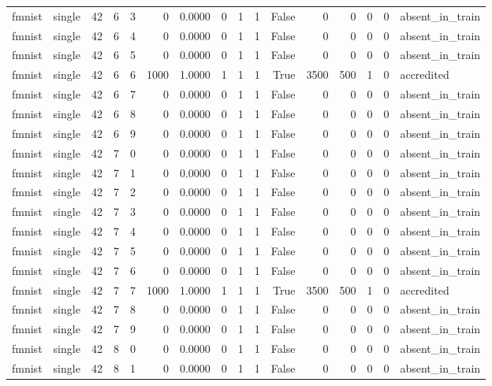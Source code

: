 \begin{tabular}{llrrrrrrrrrrrrrl}
fmnist & single & 42 & 6 & 3 & 0 & 0.0000 & 0 & 1 & 1 & False & 0 & 0 & 0 & 0 & absent\_in\_train \\
fmnist & single & 42 & 6 & 4 & 0 & 0.0000 & 0 & 1 & 1 & False & 0 & 0 & 0 & 0 & absent\_in\_train \\
fmnist & single & 42 & 6 & 5 & 0 & 0.0000 & 0 & 1 & 1 & False & 0 & 0 & 0 & 0 & absent\_in\_train \\
fmnist & single & 42 & 6 & 6 & 1000 & 1.0000 & 1 & 1 & 1 & True & 3500 & 500 & 1 & 0 & accredited \\
fmnist & single & 42 & 6 & 7 & 0 & 0.0000 & 0 & 1 & 1 & False & 0 & 0 & 0 & 0 & absent\_in\_train \\
fmnist & single & 42 & 6 & 8 & 0 & 0.0000 & 0 & 1 & 1 & False & 0 & 0 & 0 & 0 & absent\_in\_train \\
fmnist & single & 42 & 6 & 9 & 0 & 0.0000 & 0 & 1 & 1 & False & 0 & 0 & 0 & 0 & absent\_in\_train \\
fmnist & single & 42 & 7 & 0 & 0 & 0.0000 & 0 & 1 & 1 & False & 0 & 0 & 0 & 0 & absent\_in\_train \\
fmnist & single & 42 & 7 & 1 & 0 & 0.0000 & 0 & 1 & 1 & False & 0 & 0 & 0 & 0 & absent\_in\_train \\
fmnist & single & 42 & 7 & 2 & 0 & 0.0000 & 0 & 1 & 1 & False & 0 & 0 & 0 & 0 & absent\_in\_train \\
fmnist & single & 42 & 7 & 3 & 0 & 0.0000 & 0 & 1 & 1 & False & 0 & 0 & 0 & 0 & absent\_in\_train \\
fmnist & single & 42 & 7 & 4 & 0 & 0.0000 & 0 & 1 & 1 & False & 0 & 0 & 0 & 0 & absent\_in\_train \\
fmnist & single & 42 & 7 & 5 & 0 & 0.0000 & 0 & 1 & 1 & False & 0 & 0 & 0 & 0 & absent\_in\_train \\
fmnist & single & 42 & 7 & 6 & 0 & 0.0000 & 0 & 1 & 1 & False & 0 & 0 & 0 & 0 & absent\_in\_train \\
fmnist & single & 42 & 7 & 7 & 1000 & 1.0000 & 1 & 1 & 1 & True & 3500 & 500 & 1 & 0 & accredited \\
fmnist & single & 42 & 7 & 8 & 0 & 0.0000 & 0 & 1 & 1 & False & 0 & 0 & 0 & 0 & absent\_in\_train \\
fmnist & single & 42 & 7 & 9 & 0 & 0.0000 & 0 & 1 & 1 & False & 0 & 0 & 0 & 0 & absent\_in\_train \\
fmnist & single & 42 & 8 & 0 & 0 & 0.0000 & 0 & 1 & 1 & False & 0 & 0 & 0 & 0 & absent\_in\_train \\
fmnist & single & 42 & 8 & 1 & 0 & 0.0000 & 0 & 1 & 1 & False & 0 & 0 & 0 & 0 & absent\_in\_train \\

\end{tabular}
